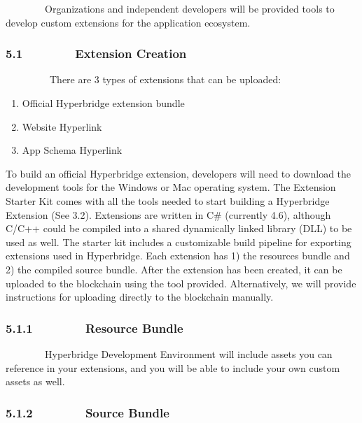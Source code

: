 \documentclass[]{article}
\providecommand{\tightlist}{%
  \setlength{\itemsep}{0pt}\setlength{\parskip}{0pt}}
\begin{document}
{~~~~~~~~Organizations and independent developers will be provided tools
to develop custom extensions for the application ecosystem.}

{}

\hypertarget{h.vtwavmt7boqd}{%
\subsubsection{\texorpdfstring{{5.1~~~~~~~~Extension
Creation}}{5.1~~~~~~~~Extension Creation}}\label{h.vtwavmt7boqd}}

{~~~~~~~~~There are 3 types of extensions that can be uploaded:}

\begin{enumerate}
\tightlist
\item
  {Official Hyperbridge extension bundle}
\item
  {Website Hyperlink}
\item
  {App Schema Hyperlink}
\end{enumerate}

{}

{To build an official Hyperbridge extension, developers will need to
download the development tools for the Windows or Mac operating system.
The Extension Starter Kit comes with all the tools needed to start
building a Hyperbridge Extension (See 3.2). Extensions are written in
C\# (currently 4.6), although C/C++ could be compiled into a shared
dynamically linked library (DLL) to be used as well. The starter kit
includes a customizable build pipeline for exporting extensions used in
Hyperbridge. Each extension has 1) the resources bundle and 2) the
compiled source bundle. After the extension has been created, it can be
uploaded to the blockchain using the tool provided. Alternatively, we
will provide instructions for uploading directly to the blockchain
manually.}

\hypertarget{h.58bq6hrt384h}{%
\subsubsection{\texorpdfstring{{5.1.1~~~~~~~~Resource
Bundle}}{5.1.1~~~~~~~~Resource Bundle}}\label{h.58bq6hrt384h}}

{~~~~~~~~Hyperbridge Development Environment will include assets you can
reference in your extensions, and you will be able to include your own
custom assets as well.}

\hypertarget{h.fyix8o971n5b}{%
\subsubsection{\texorpdfstring{{5.1.2~~~~~~~~Source
Bundle}}{5.1.2~~~~~~~~Source Bundle}}\label{h.fyix8o971n5b}}
\end{document}
